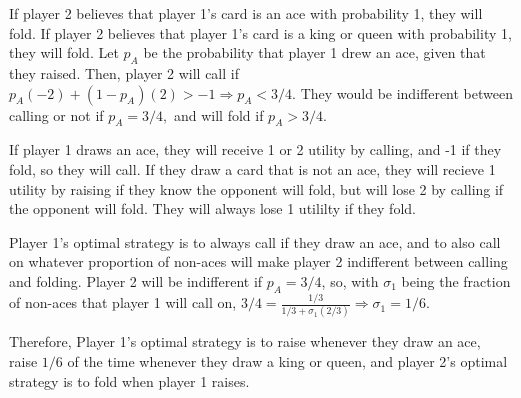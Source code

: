 \documentclass[11pt]{article} %
\begin{document}
If player 2 believes that player 1's card is an ace with probability 1, they will fold. If player 2 believes that player 1's card is a king or queen with probability 1, they  will fold. Let $p_A$ be the probability that player 1 drew an ace, given that they raised. Then, player 2 will call if $p_A(-2) + (1-p_A)(2)> -1\Rightarrow p_A< 3/4$. They would be indifferent between calling or not if $p_A = 3/4,$ and will fold if $p_A>3/4$. 

If player 1 draws an ace, they will receive 1 or 2 utility by calling, and -1 if they fold, so they will call. If they draw a card that is not an ace, they will recieve 1 utility by raising if they know the opponent will fold, but will lose 2 by calling if the opponent will fold. They will  always lose 1 utililty if they fold.

Player 1's optimal strategy is to always call if they draw an ace, and to also call on whatever proportion of non-aces will make player 2 indifferent between calling and folding. Player 2 will be indifferent if $p_A = 3/4$, so, with $\sigma_1$ being the fraction of non-aces that player 1 will call on, $3/4 = \frac{1/3}{1/3 + \sigma_1(2/3)} \Rightarrow \sigma_1 = 1/6.$

Therefore, Player 1's optimal strategy is to raise whenever they draw an ace, raise $1/6$ of the time whenever they draw a king or queen, and player 2's optimal strategy is to fold when player 1 raises.
\end{document}
